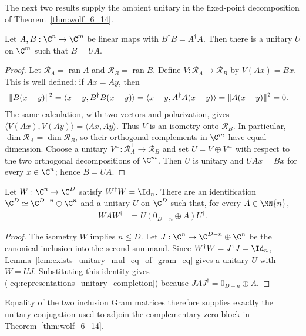 The next two results supply the ambient unitary in the fixed-point decomposition
of Theorem~\ref{thm:wolf_6_14}.

\begin{lemma}
    \label{lem:exists_unitary_mul_eq_of_gram_eq}
    \leanok
    \uses{}
    Let $A,B:\C^n\to\C^m$ be linear maps with
    $B^\dagger B=A^\dagger A$. Then there is a unitary
    $U$ on $\C^m$ such that $B=UA$.
\end{lemma}

\begin{proof}
    \leanok
    Let $\mathcal R_A=\operatorname{ran}A$ and
    $\mathcal R_B=\operatorname{ran}B$. Define
    $V:\mathcal R_A\to\mathcal R_B$ by $V(Ax)=Bx$. This is well defined:
    if $Ax=Ay$, then
    \begin{align}
        \lVert B(x-y)\rVert^2
         & =\langle x-y,B^\dagger B(x-y)\rangle
        =\langle x-y,A^\dagger A(x-y)\rangle
        =\lVert A(x-y)\rVert^2=0.
        \notag
    \end{align}
    The same calculation, with two vectors and polarization, gives
    $\langle V(Ax),V(Ay)\rangle=\langle Ax,Ay\rangle$. Thus $V$ is an
    isometry onto $\mathcal R_B$. In particular,
    $\dim\mathcal R_A=\dim\mathcal R_B$, so their orthogonal complements
    in $\C^m$ have equal dimension. Choose a unitary
    $V^\perp:\mathcal R_A^\perp\to\mathcal R_B^\perp$ and set
    $U=V\oplus V^\perp$ with respect to the two orthogonal decompositions of
    $\C^m$. Then $U$ is unitary and $UAx=Bx$ for every $x\in\C^n$; hence
    $B=UA$.
\end{proof}

\begin{theorem}
    \label{thm:isometric_inclusion_zero_extension}
    \leanok
    Let $W:\C^n\to\C^D$ satisfy $W^\dagger W=\Id_n$. There are an
    identification $\C^D\simeq\C^{D-n}\oplus\C^n$ and a unitary $U$ on
    $\C^D$ such that, for every $A\in\MN{n}$,
    \begin{align}
        WAW^\dagger
         & =U(0_{D-n}\oplus A)U^\dagger.
        \label{eq:representations_unitary_completion}
    \end{align}
\end{theorem}

\begin{proof}
    \leanok
    The isometry $W$ implies $n\leq D$. Let $J:\C^n\to
        \C^{D-n}\oplus\C^n$ be the canonical inclusion into the second summand.
    Since $W^\dagger W=J^\dagger J=\Id_n$,
    Lemma~\ref{lem:exists_unitary_mul_eq_of_gram_eq}
    gives a unitary $U$ with $W=UJ$. Substituting this identity gives
    (\ref{eq:representations_unitary_completion}) because
    $JAJ^\dagger=0_{D-n}\oplus A$.
\end{proof}

Equality of the two inclusion Gram matrices therefore supplies exactly the
unitary conjugation used to adjoin the complementary zero block in
Theorem~\ref{thm:wolf_6_14}.